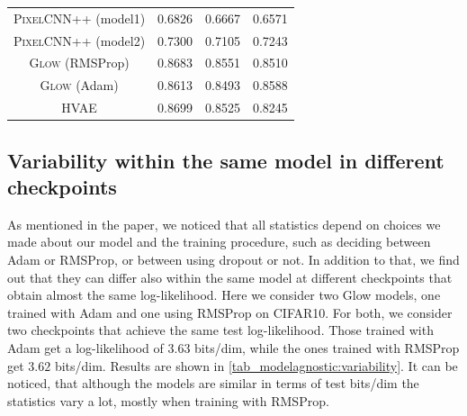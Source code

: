 {\begin{table}[tb]
\begin{tabular}{cccc}
            \textsc{PixelCNN++} (model1)  & 0.6826 & 0.6667 & 0.6571  \\
            \textsc{PixelCNN++} (model2) & 0.7300 & 0.7105 & 0.7243 \\
            \textsc{Glow} (RMSProp)  &  0.8683 & 0.8551 & 0.8510\\
            \textsc{Glow} (Adam) & 0.8613 & 0.8493 & 0.8588  \\
            \textsc{HVAE}  & 0.8699 &  0.8525 & 0.8245 \\
            \bottomrule
        \end{tabular}
        \label{tab_modelagnostic:all_combinations}
    \vspace*{-\baselineskip}
\end{table}

\subsection{Variability within the same model in different checkpoints}
\label{appendix_modelagnostic:checkpoints}
As mentioned in the paper, we noticed that all statistics depend on choices we made about our model and the training procedure, such as deciding between Adam or RMSProp, or between using dropout or not. In addition to that, we find out that they can differ also within the same model at different checkpoints that obtain almost the same log-likelihood. Here we consider two Glow models, one trained with Adam and one using RMSProp on CIFAR10. For both, we consider two checkpoints that achieve the same test log-likelihood. Those trained with Adam get a log-likelihood of $3.63$ bits/dim, while the ones trained with RMSProp get $3.62$ bits/dim. Results are shown in \cref{tab_modelagnostic:variability}. It can be noticed, that although the models are similar in terms of test bits/dim the statistics vary a lot, mostly when training with RMSProp.

}
